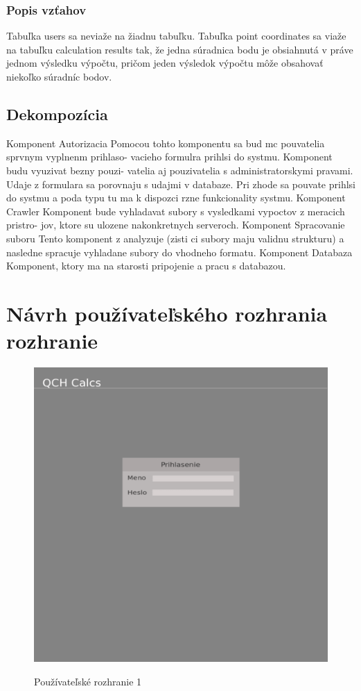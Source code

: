 \documentclass[12pt,a4paper]{article}
\begin{document}
\subsubsection*{Popis vzťahov}
Tabuľka users sa neviaže na žiadnu tabuľku. Tabuľka point coordinates sa viaže na tabuľku calculation results tak, že jedna súradnica bodu je obsiahnutá v práve jednom výsledku výpočtu, pričom jeden výsledok výpočtu môže obsahovať niekoľko súradníc bodov.


\subsection{Dekompozícia}
Komponent Autorizacia
Pomocou tohto komponentu sa bud mc pouvatelia sprvnym vyplnenm prihlaso- vacieho formulra prihlsi do systmu. Komponent budu vyuzivat bezny pouzi- vatelia aj pouzivatelia s administratorskymi pravami. Udaje z formulara sa porovnaju s udajmi v databaze. Pri zhode sa pouvate prihlsi do systmu a poda typu tu ma k dispozci rzne funkcionality systmu.
Komponent Crawler
Komponent bude vyhladavat subory s vysledkami vypoctov z meracich pristro- jov, ktore su ulozene nakonkretnych serveroch.
Komponent Spracovanie suboru
Tento komponent z analyzuje (zisti ci subory maju validnu strukturu) a nasledne spracuje vyhladane subory do vhodneho formatu.
Komponent Databaza
Komponent, ktory ma na starosti pripojenie a pracu s databazou.

\section{Návrh používateľského rozhrania rozhranie}
\begin{figure}[H]
	\caption{Používateľské rozhranie 1}
	\includegraphics[width=\textwidth]{dizajn-1}
	\label{fig:ui1}
\end{figure}
\end{document}
